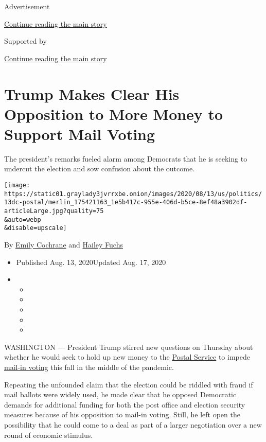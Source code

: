 Advertisement

\protect\hyperlink{after-top}{Continue reading the main story}

Supported by

\protect\hyperlink{after-sponsor}{Continue reading the main story}

\hypertarget{trump-makes-clear-his-opposition-to-more-money-to-support-mail-voting}{%
\section{Trump Makes Clear His Opposition to More Money to Support Mail
Voting}\label{trump-makes-clear-his-opposition-to-more-money-to-support-mail-voting}}

The president's remarks fueled alarm among Democrats that he is seeking
to undercut the election and sow confusion about the outcome.

\texttt{[image: https://static01.graylady3jvrrxbe.onion/images/2020/08/13/us/politics/13dc-postal/merlin\_175421163\_1e5b417c-955e-406d-b5ce-8ef48a3902df-articleLarge.jpg?quality=75\\\&auto=webp\\\&disable=upscale]}

By \href{https://www.nytimes3xbfgragh.onion/by/emily-cochrane}{Emily
Cochrane} and
\href{https://www.nytimes3xbfgragh.onion/by/hailey-fuchs}{Hailey Fuchs}

\begin{itemize}
\item
  Published Aug. 13, 2020Updated Aug. 17, 2020
\item
  \begin{itemize}
  \item
  \item
  \item
  \item
  \item
  \end{itemize}
\end{itemize}

WASHINGTON --- President Trump stirred new questions on Thursday about
whether he would seek to hold up new money to the
\href{https://www.nytimes3xbfgragh.onion/2020/08/22/business/economy/dejoy-postmaster-general-trump-mnuchin.html}{Postal
Service} to impede
\href{https://www.nytimes3xbfgragh.onion/interactive/2020/08/11/us/politics/vote-by-mail-us-states.html}{mail-in
voting} this fall in the middle of the pandemic.

Repeating the unfounded claim that the election could be riddled with
fraud if mail ballots were widely used, he made clear that he opposed
Democratic demands for additional funding for both the post office and
election security measures because of his opposition to mail-in voting.
Still, he left open the possibility that he could come to a deal as part
of a larger negotiation over a new round of economic stimulus.

